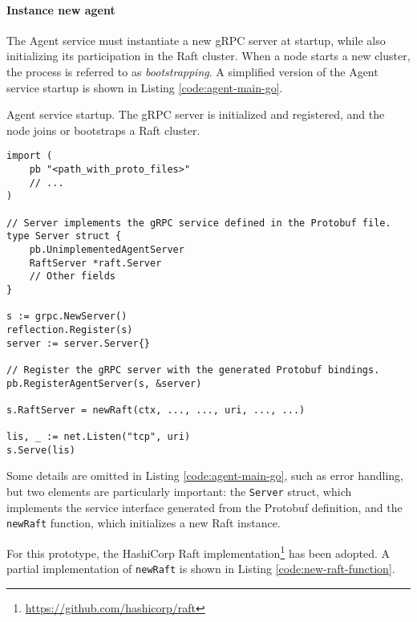 \paragraph{Instance new agent}

The Agent service must instantiate a new gRPC server at startup, while also initializing its participation in the Raft cluster. When a node starts a new cluster, the process is referred to as \emph{bootstrapping}. A simplified version of the Agent service startup is shown in Listing \ref{code:agent-main-go}.

\begin{listing}[H]
\caption{Agent service startup. The gRPC server is initialized and registered, and the node joins or bootstraps a Raft cluster.}
\label{code:agent-main-go}
\begin{verbatim}
import (
    pb "<path_with_proto_files>"
    // ...
)

// Server implements the gRPC service defined in the Protobuf file.
type Server struct {
    pb.UnimplementedAgentServer
    RaftServer *raft.Server
    // Other fields
}

s := grpc.NewServer()
reflection.Register(s)
server := server.Server{}

// Register the gRPC server with the generated Protobuf bindings.
pb.RegisterAgentServer(s, &server)

s.RaftServer = newRaft(ctx, ..., ..., uri, ..., ...)

lis, _ := net.Listen("tcp", uri)
s.Serve(lis)
\end{verbatim}
\end{listing}

Some details are omitted in Listing \ref{code:agent-main-go}, such as error handling, but two elements are particularly important:
the \texttt{Server} struct, which implements the service interface generated from the Protobuf definition, and the \texttt{newRaft} function, which initializes a new Raft instance.  

For this prototype, the HashiCorp Raft implementation\footnote{\url{https://github.com/hashicorp/raft}} has been adopted. A partial implementation of \texttt{newRaft} is shown in Listing \ref{code:new-raft-function}.

